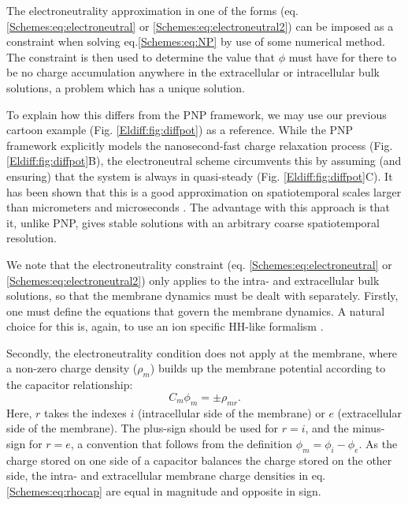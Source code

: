 The electroneutrality approximation in one of the forms (eq. \ref{Schemes:eq:electroneutral} or \ref{Schemes:eq:electroneutral2}) can be imposed as a constraint when solving eq.\ref{Schemes:eq:NP} by use of some numerical method. The constraint is then used to determine the value that $\phi$ must have for there to be no charge accumulation anywhere in the extracellular or intracellular bulk solutions, a problem which has a unique solution. 

To explain how this differs from the PNP framework, we may use our previous cartoon example (Fig. \ref{Eldiff:fig:diffpot}) as a reference. While the PNP framework explicitly models the nanosecond-fast charge relaxation process (Fig. \ref{Eldiff:fig:diffpot}B), the electroneutral scheme circumvents this by assuming (and ensuring) that the system is always in quasi-steady (Fig. \ref{Eldiff:fig:diffpot}C). It has been shown that this is a good approximation on spatiotemporal scales larger than micrometers and microseconds \citep{Grodzinsky2011, Pods2017, Solbra2018}. The advantage with this approach is that it, unlike PNP, gives stable solutions with an arbitrary coarse spatiotemporal resolution.

We note that the electroneutrality constraint (eq. \ref{Schemes:eq:electroneutral} or \ref{Schemes:eq:electroneutral2}) only applies to the intra- and extracellular bulk solutions, so that the membrane dynamics must be dealt with separately. Firstly, one must define the equations that govern the membrane dynamics. A natural choice for this is, again, to use an ion specific HH-like formalism \cite{Mori2006, Mori2009, Pods2017, ellingsrud2020}. 

Secondly, the electroneutrality condition does not apply at the membrane, where a non-zero charge density ($\rho_{m}$) builds up the membrane potential according to the capacitor relationship:
\begin{equation}
C_m \phi_{m} = \pm \rho_{mr}.
\label{Schemes:eq:rhocap}
\end{equation}
Here, $r$ takes the indexes $i$ (intracellular side of the membrane) or $e$ (extracellular side of the membrane). The plus-sign should be used for $r=i$, and the minus-sign for $r=e$, a convention that follows from the definition $\phi_{m} = \phi_{i} - \phi_{e}$. As the charge stored on one side of a capacitor balances the charge stored on the other side, the intra- and extracellular membrane charge densities in eq. \ref{Schemes:eq:rhocap} are equal in magnitude and opposite in sign.


